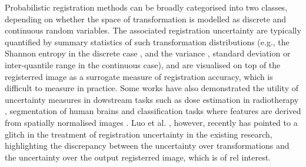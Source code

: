Probabilistic registration methods can be broadly categorised into two classes, depending on whether the space of transformation is modelled as discrete \cite{cobzas2011random,popuri2013variational,heinrich2016deformable} and continuous \cite{van2008encoding,simpson2012probabilistic,risholm2013bayesian,zhang2013bayesian,wassermann2014probabilistic,simpson2015probabilistic,le2016quantifying} random variables. The associated registration uncertainty are typically quantified by summary statistics of such transformation distributions (e.g., the Shannon entropy in the discrete case \cite{lotfi2013improving}, and the variance \cite{simpson2012probabilistic,le2016quantifying}, standard deviation\cite{simpson2015probabilistic} or inter-quantile range \cite{risholm2013bayesian,risholm2010summarizing} in the continuous case), and are visualised on top of the registerred image as a surrogate measure of registration accuracy, which is difficult to measure in practice. Some works have also demonstrated the utility of uncertainty measures in dowstream tasks such as dose estimation in radiotherapy \cite{risholm2011estimation}, segmentation of human brains \cite{simpson2011probabilistic} and classification tasks where features are derived from spatially normalised images \cite{simpson2012ensemble}. Luo et al. \cite{wells2018miccai}, however, recently has pointed to a glitch in the treatment of registration uncertainty in the existing research, highlighting the discrepancy between the  uncertainty over transformations and the uncertainty over the output registerred image, which is of rel interest. 




%
%



